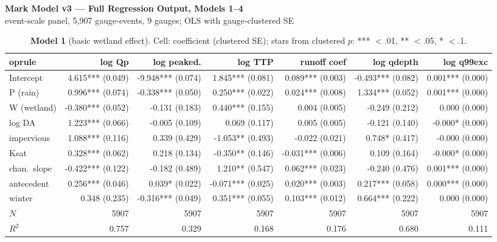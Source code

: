\documentclass[10pt]{article}
\begin{document}
\begin{center}\Large\textbf{Mark Model v3 --- Full Regression Output, Models 1--4}\\
\normalsize event-scale panel, 5{,}907 gauge-events, 9 gauges; OLS with gauge-clustered SE\end{center}
\begin{landscape}\begin{table}[htbp]\centering
\caption{\textbf{Model 1} (basic wetland effect). Cell: coefficient (clustered SE); stars from clustered $p$: *** $<$.01, ** $<$.05, * $<$.1.}
\scriptsize\begin{tabular}{lrrrrrr}	oprule
 & \textbf{log Qp} & \textbf{log peaked.} & \textbf{log TTP} & \textbf{runoff coef} & \textbf{log qdepth} & \textbf{log q99exc} \\ \midrule
Intercept & 4.615*** (0.049) & -9.948*** (0.074) & 1.845*** (0.081) & 0.089*** (0.003) & -0.493*** (0.082) & 0.001*** (0.000) \\
P (rain) & 0.996*** (0.074) & -0.338*** (0.050) & 0.250*** (0.022) & 0.024*** (0.008) & 1.334*** (0.052) & 0.001*** (0.000) \\
W (wetland) & -0.380*** (0.052) & -0.131 (0.183) & 0.440*** (0.155) & 0.004 (0.005) & -0.249 (0.212) & 0.000 (0.000) \\
log DA & 1.223*** (0.066) & -0.005 (0.109) & 0.069 (0.117) & 0.005 (0.005) & -0.121 (0.140) & -0.000* (0.000) \\
impervious & 1.088*** (0.116) & 0.339 (0.429) & -1.053** (0.493) & -0.022 (0.021) & 0.748* (0.417) & -0.000 (0.000) \\
Ksat & 0.328*** (0.062) & 0.218 (0.134) & -0.350** (0.146) & -0.031*** (0.006) & 0.109 (0.164) & -0.000* (0.000) \\
chan.\ slope & -0.422*** (0.122) & -0.182 (0.489) & 1.210** (0.547) & 0.062*** (0.023) & -0.240 (0.476) & 0.001*** (0.000) \\
antecedent & 0.256*** (0.046) & 0.039* (0.022) & -0.071*** (0.025) & 0.020*** (0.003) & 0.217*** (0.058) & 0.000*** (0.000) \\
winter & 0.348 (0.235) & -0.316*** (0.049) & 0.351*** (0.055) & 0.103*** (0.012) & 0.664*** (0.222) & 0.000 (0.000) \\
\midrule
$N$ & 5907 & 5907 & 5907 & 5907 & 5907 & 5907 \\
$R^2$ & 0.757 & 0.329 & 0.168 & 0.176 & 0.680 & 0.111 \\
\bottomrule\end{tabular}
\end{table}\end{landscape}
\end{document}
